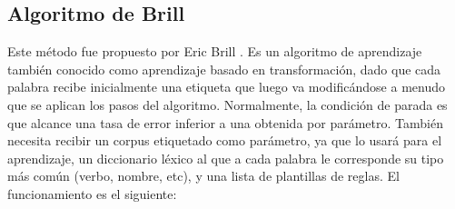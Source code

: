\subsection*{Algoritmo de Brill}
Este método fue propuesto por Eric Brill \citet{brill1992simple}. Es un algoritmo de aprendizaje también conocido como aprendizaje basado en transformación, dado que cada palabra recibe inicialmente una etiqueta que luego va modificándose a menudo que se aplican los pasos del algoritmo. Normalmente, la condición de parada es que alcance una tasa de error inferior a una obtenida por parámetro. También necesita recibir un corpus etiquetado como parámetro, ya que lo usará para el aprendizaje, un diccionario léxico al que a cada palabra le corresponde su tipo más común (verbo, nombre, etc), y una lista de plantillas de reglas. \newline
El funcionamiento es el siguiente:
